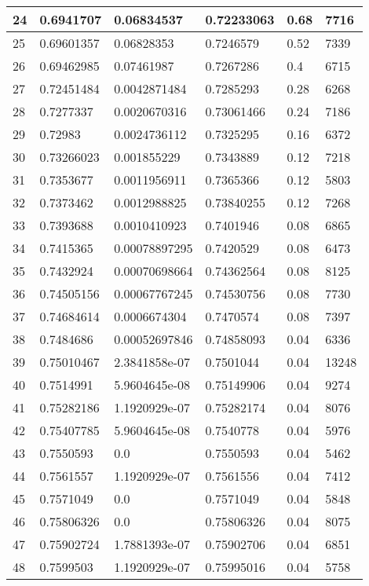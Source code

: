 \begin{longtable}{|l|l|l|l|l|l|}
24 & 0.6941707 & 0.06834537 & 0.72233063 & 0.68 & 7716 \\ \hline 
25 & 0.69601357 & 0.06828353 & 0.7246579 & 0.52 & 7339 \\ \hline 
26 & 0.69462985 & 0.07461987 & 0.7267286 & 0.4 & 6715 \\ \hline 
27 & 0.72451484 & 0.0042871484 & 0.7285293 & 0.28 & 6268 \\ \hline 
28 & 0.7277337 & 0.0020670316 & 0.73061466 & 0.24 & 7186 \\ \hline 
29 & 0.72983 & 0.0024736112 & 0.7325295 & 0.16 & 6372 \\ \hline 
30 & 0.73266023 & 0.001855229 & 0.7343889 & 0.12 & 7218 \\ \hline 
31 & 0.7353677 & 0.0011956911 & 0.7365366 & 0.12 & 5803 \\ \hline 
32 & 0.7373462 & 0.0012988825 & 0.73840255 & 0.12 & 7268 \\ \hline 
33 & 0.7393688 & 0.0010410923 & 0.7401946 & 0.08 & 6865 \\ \hline 
34 & 0.7415365 & 0.00078897295 & 0.7420529 & 0.08 & 6473 \\ \hline 
35 & 0.7432924 & 0.00070698664 & 0.74362564 & 0.08 & 8125 \\ \hline 
36 & 0.74505156 & 0.00067767245 & 0.74530756 & 0.08 & 7730 \\ \hline 
37 & 0.74684614 & 0.0006674304 & 0.7470574 & 0.08 & 7397 \\ \hline 
38 & 0.7484686 & 0.00052697846 & 0.74858093 & 0.04 & 6336 \\ \hline 
39 & 0.75010467 & 2.3841858e-07 & 0.7501044 & 0.04 & 13248 \\ \hline 
40 & 0.7514991 & 5.9604645e-08 & 0.75149906 & 0.04 & 9274 \\ \hline 
41 & 0.75282186 & 1.1920929e-07 & 0.75282174 & 0.04 & 8076 \\ \hline 
42 & 0.75407785 & 5.9604645e-08 & 0.7540778 & 0.04 & 5976 \\ \hline 
43 & 0.7550593 & 0.0 & 0.7550593 & 0.04 & 5462 \\ \hline 
44 & 0.7561557 & 1.1920929e-07 & 0.7561556 & 0.04 & 7412 \\ \hline 
45 & 0.7571049 & 0.0 & 0.7571049 & 0.04 & 5848 \\ \hline 
46 & 0.75806326 & 0.0 & 0.75806326 & 0.04 & 8075 \\ \hline 
47 & 0.75902724 & 1.7881393e-07 & 0.75902706 & 0.04 & 6851 \\ \hline 
48 & 0.7599503 & 1.1920929e-07 & 0.75995016 & 0.04 & 5758 \\ \hline 

\end{longtable}
